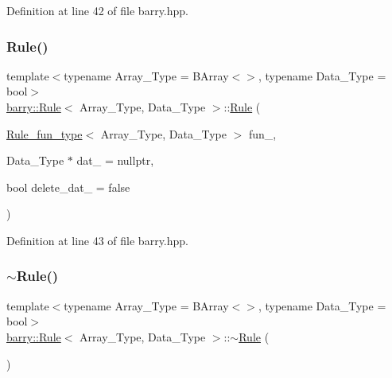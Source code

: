 Definition at line 42 of file barry.\+hpp.

\mbox{\label{classbarry_1_1_rule_a2d63309b0ff8cd5d2c4827b9daf03b3a}} 
\subsubsection{\texorpdfstring{Rule()}{Rule()}\hspace{0.1cm}{\footnotesize\ttfamily [2/2]}}
{\footnotesize\ttfamily template$<$typename Array\+\_\+\+Type  = B\+Array$<$$>$, typename Data\+\_\+\+Type  = bool$>$ \\
\hyperlink{classbarry_1_1_rule}{barry\+::\+Rule}$<$ Array\+\_\+\+Type, Data\+\_\+\+Type $>$\+::\hyperlink{classbarry_1_1_rule}{Rule} (\begin{DoxyParamCaption}\item[{\hyperlink{namespacebarry_aefd7e6d4ba228e2ce1074d075c512178}{Rule\+\_\+fun\+\_\+type}$<$ Array\+\_\+\+Type, Data\+\_\+\+Type $>$}]{fun\+\_\+,  }\item[{Data\+\_\+\+Type $\ast$}]{dat\+\_\+ = {\ttfamily nullptr},  }\item[{bool}]{delete\+\_\+dat\+\_\+ = {\ttfamily false} }\end{DoxyParamCaption})\hspace{0.3cm}{\ttfamily [inline]}}



Definition at line 43 of file barry.\+hpp.

\mbox{\label{classbarry_1_1_rule_a5b56209f553a6fe5b841395eec8e3101}} 
\subsubsection{\texorpdfstring{$\sim$\+Rule()}{~Rule()}}
{\footnotesize\ttfamily template$<$typename Array\+\_\+\+Type  = B\+Array$<$$>$, typename Data\+\_\+\+Type  = bool$>$ \\
\hyperlink{classbarry_1_1_rule}{barry\+::\+Rule}$<$ Array\+\_\+\+Type, Data\+\_\+\+Type $>$\+::$\sim$\hyperlink{classbarry_1_1_rule}{Rule} (\begin{DoxyParamCaption}{ }\end{DoxyParamCaption})\hspace{0.3cm}{\ttfamily [inline]}}




